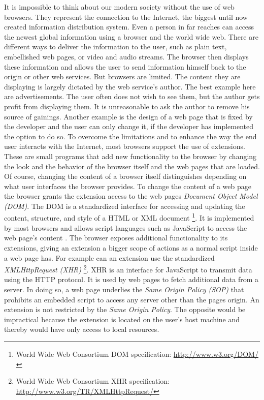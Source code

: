 \documentclass[article,colorback,accentcolor=tud9c,type=bsc]{tudthesis}
\begin{document}
	It is impossible to think about our modern society without the use of web browsers. They represent the connection to the Internet, the biggest until now created information distribution system. Even a person in far reaches can access the newest global information using a browser and the world wide web. There are different ways to deliver the information to the user, such as plain text, embellished web pages, or video and audio streams. The browser then displays these information and allows the user to send information himself back to the origin or other web services. But browsers are limited. The content they are displaying is largely dictated by the web service's author. The best %
	example here are advertisements. The user often does not wish to see them, but the author gets profit from displaying them. It is unreasonable to ask the author to remove his source of gainings. Another example is the design of a web page that is fixed by the developer and the user can only change it, if the developer has implemented the option to do so. To overcome the limitations and to enhance the way the end user interacts with the Internet, most browsers support the use of extensions. These are small programs that add new functionality to the browser by changing the look and the behavior of the browser itself and the web pages that are loaded. Of course, changing the content of a browser itself distinguishes depending on what user interfaces the browser provides. To change the content of a web page the browser grants the extension access to the web pages \textit{Document Object Model (DOM)}. The DOM is a standardized interface for accessing and updating the content, structure, and style of a HTML or XML document \footnote{World Wide Web Consortium DOM specification: \url{http://www.w3.org/DOM/}}. It is implemented by most browsers and allows script languages such as JavaScript to access the web page's content \cite{domBrowserCompatibility}. The browser exposes additional functionality to its extensions, giving an extension a bigger scope of actions as a normal script inside a web page has. For example can an extension use the standardized \textit{XMLHttpRequest (XHR)} \footnote{World Wide Web Consortium XHR specification: \url{http://www.w3.org/TR/XMLHttpRequest/}}. XHR is an interface for JavaScript to transmit data using the HTTP protocol. It is used by web pages to fetch additional data from a server. In doing so, a web page underlies the \textit{Same Origin Policy (SOP)} that prohibits an embedded script to access any server other than the pages origin. An extension is not restricted by the \textit{Same Origin Policy}. The opposite would be impractical because the extension is located on the user's host machine and thereby would have only access to local resources. \\
\end{document}
